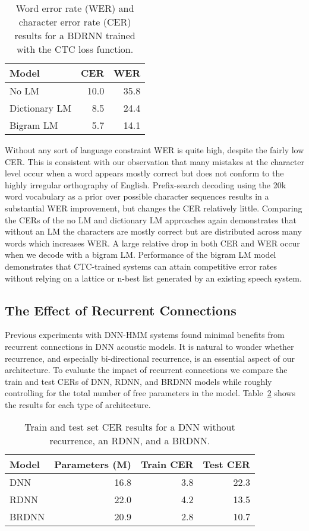 \begin{table}
\centering
\begin{tabular}{lrr}
\toprule
Model & CER & WER\\
\midrule
No LM         & 10.0 & 35.8 \\
Dictionary LM & 8.5  & 24.4 \\
Bigram LM     & 5.7  & 14.1 \\
\bottomrule
\end{tabular}
\caption{Word error rate (WER) and character error rate (CER) results
  for a BDRNN trained with the CTC loss function.}
\label{tab:first_pass:res_decode}
\end{table}

Without any sort of language constraint WER is quite high, despite the fairly
low CER. This is consistent with our observation that many mistakes at the
character level occur when a word appears mostly correct but does not conform
to the highly irregular orthography of English. Prefix-search decoding using
the 20k word vocabulary as a prior over possible character sequences results in
a substantial WER improvement, but changes the CER relatively little. Comparing
the CERs of the no LM and dictionary LM approaches again demonstrates that
without an LM the characters are mostly correct but are distributed across many
words which increases WER. A large relative drop in both CER and WER occur when
we decode with a bigram LM. Performance of the bigram LM model demonstrates
that CTC-trained systems can attain competitive error rates without relying on
a lattice or n-best list generated by an existing speech system.

\subsection{The Effect of Recurrent Connections}

Previous experiments with DNN-HMM systems found minimal benefits from recurrent
connections in DNN acoustic models. It is natural to wonder whether recurrence,
and especially bi-directional recurrence, is an essential aspect of our
architecture. To evaluate the impact of recurrent connections we compare the
train and test CERs of DNN, RDNN, and BRDNN models while roughly controlling
for the total number of free parameters in the model.
Table~\ref{tab:first_pass:res_recurrence} shows the results for each type of
architecture. 

\begin{table}
\centering
\begin{tabular}{lrrr}
\toprule
Model & Parameters (M) & Train CER & Test CER \\
\midrule
DNN   & 16.8 & 3.8 & 22.3 \\
RDNN  & 22.0 & 4.2 & 13.5 \\
BRDNN & 20.9 & 2.8 & 10.7 \\
\bottomrule
\end{tabular}
\caption{Train and test set CER results for a DNN without recurrence, an RDNN,
         and a BRDNN.}
\label{tab:first_pass:res_recurrence}
\end{table}

